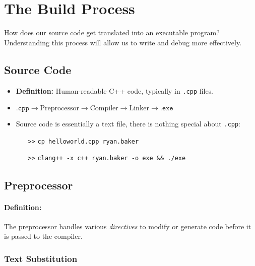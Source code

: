 \documentclass{article}
\title{\thistitle}
\author{\me}
\date{\today}
\begin{document}
\maketitle
\tableofcontents
\pagebreak

\section{The Build Process}

\noindent
How does our source code get translated into an executable program? Understanding this process will allow us to write and debug more effectively.

\subsection{Source Code}

\begin{itemize}
	\item \textbf{Definition:} Human-readable C++ code, typically in \texttt{.cpp} files.
	\item $\texttt{.cpp}\rightarrow\boxed{\textrm{Preprocessor}}\rightarrow\boxed{\textrm{Compiler}}\rightarrow\boxed{\textrm{Linker}}\rightarrow\texttt{.exe}$
	\item Source code is essentially a text file, there is nothing special about \texttt{.cpp}:
	\begin{itemize}
		\item[\texttt{>>}] \texttt{cp helloworld.cpp ryan.baker}
		\item[\texttt{>>}] \texttt{clang++ -x c++ ryan.baker -o exe \&\& ./exe}
	\end{itemize}
\end{itemize}

\subsection{Preprocessor}

\paragraph{Definition:}

\noindent
The preprocessor handles various \textit{directives} to modify or generate code before it is passed to the compiler.

\subsubsection{Text Substitution}
\end{document}
